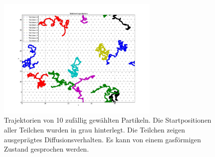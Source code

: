 \begin{figure}[h!]
	\centering
		\includegraphics[width=0.70\textwidth]{img/Tra14.jpeg}
	\caption{Trajektorien von 10 zufällig gewählten Partikeln. Die Startpositionen aller Teilchen wurden in grau hinterlegt. Die Teilchen zeigen ausgeprägtes Diffusionsverhalten. Es kann von einem gasförmigen Zustand gesprochen werden.}
	\label{fig:Tra14}
\end{figure}